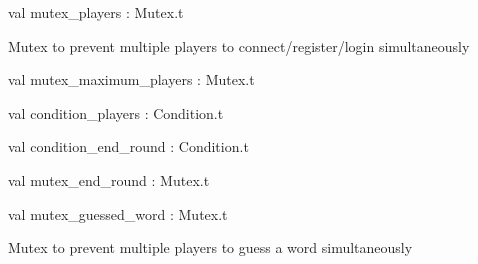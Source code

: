 \documentclass[11pt]{article}
\begin{document}
\label{val:Server.mutex-underscoreplayers}\begin{ocamldoccode}
val mutex_players : Mutex.t
\end{ocamldoccode}
\begin{ocamldocdescription}
Mutex to prevent multiple players to connect/register/login simultaneously


\end{ocamldocdescription}




\label{val:Server.mutex-underscoremaximum-underscoreplayers}\begin{ocamldoccode}
val mutex_maximum_players : Mutex.t
\end{ocamldoccode}




\label{val:Server.condition-underscoreplayers}\begin{ocamldoccode}
val condition_players : Condition.t
\end{ocamldoccode}




\label{val:Server.condition-underscoreend-underscoreround}\begin{ocamldoccode}
val condition_end_round : Condition.t
\end{ocamldoccode}




\label{val:Server.mutex-underscoreend-underscoreround}\begin{ocamldoccode}
val mutex_end_round : Mutex.t
\end{ocamldoccode}




\label{val:Server.mutex-underscoreguessed-underscoreword}\begin{ocamldoccode}
val mutex_guessed_word : Mutex.t
\end{ocamldoccode}
\begin{ocamldocdescription}
Mutex to prevent multiple players to guess a word simultaneously


\end{ocamldocdescription}
\end{document}
